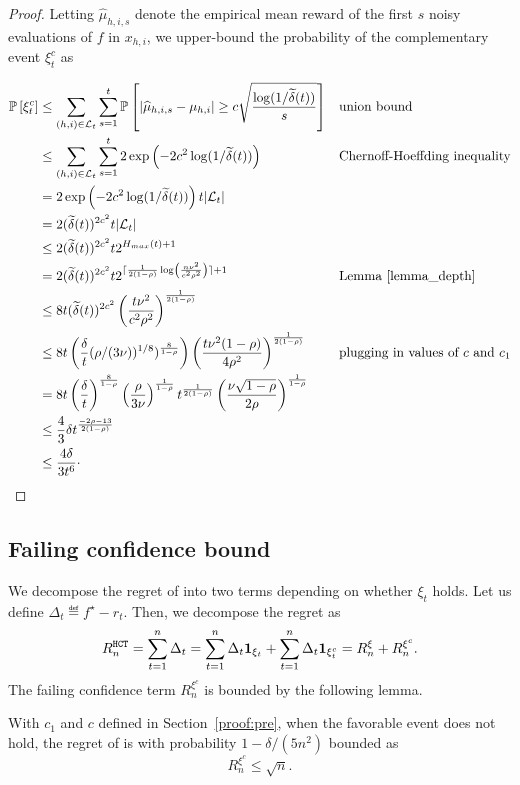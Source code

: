 \begin{proof}
Letting $\hat{\mu}_{h,i,s}$ denote the empirical mean reward of the first $s$ noisy evaluations of $f$ in $x_{h,i}$, we upper-bound the probability of the complementary event $\xi_t^c$ as

\begin{align*}
    \mathbb{P}\left[ \xi_t^c \right]
    & \leq \sum_{(h,i)\in\mathcal{L}_t}\sum_{s=1}^{t} \mathbb{P}\left[ |\widehat{\mu}_{h,i,s} - \mu_{h,i}| \geq c\sqrt{\frac{\operatorname{log}(1/\widetilde{\delta}(t))}{s}} \right] && \text{union bound} \\
    & \leq \sum_{(h,i)\in\mathcal{L}_t}\sum_{s=1}^{t} 2\operatorname{exp}\left( -2c^2\operatorname{log}(1/\widetilde{\delta}(t)) \right) && \text{Chernoff-Hoeffding inequality} \\
    & = 2\operatorname{exp}\left( -2c^2\operatorname{log}(1/\widetilde{\delta}(t)) \right) t|\mathcal{L}_t| \\
    & = 2(\widetilde{\delta}(t))^{2c^2}t|\mathcal{L}_t| \\
    & \leq 2(\widetilde{\delta}(t))^{2c^2}t 2^{H_{max}(t)+1} \\
    & = 2(\widetilde{\delta}(t))^{2c^2}t 2^{\lceil\frac{1}{2(1-\rho)}\operatorname{log}\left(\frac{n\nu^2}{c^2\rho^2} \right)\rceil+1} && \text{Lemma~\ref{lemma_depth}} \\
    & \leq 8t(\widetilde{\delta}(t))^{2c^2} \left( \frac{t\nu^2}{c^2\rho^2} \right)^{\frac{1}{2(1-\rho)}} \\
    & \leq 8t\left(\frac{\delta}{t} (\rho/(3\nu))^{1/8})^{\frac{8}{1-\rho}}\right) \left( \frac{t\nu^2(1-\rho)}{4\rho^2}\right)^{\frac{1}{2(1-\rho)}} && \text{plugging in values of $c$ and $c_1$} \\
    & = 8t\left(\frac{\delta}{t}\right)^{\frac{8}{1-\rho}} \left(\frac{\rho}{3\nu}\right)^{\frac{1}{1-\rho}} t^{\frac{1}{2(1-\rho)}} \left( \frac{\nu\sqrt{1-\rho}}{2\rho}\right)^{\frac{1}{1-\rho}} \\
    & \leq \frac{4}{3} \delta t^{\frac{-2\rho-13}{2(1-\rho)}} \\
    & \leq \frac{4\delta}{3t^6}\cdot
\end{align*}

\end{proof}

\subsection{Failing confidence bound}\label{proof:lemma_failing}

We decompose the regret of \HCT into two terms depending on whether $\xi_t$ holds. Let us define $\Delta_t \eqdef f^\star - r_t$. Then, we decompose the regret as
\[
R_n^{\texttt{HCT}} = \sum_{t=1}^n \Delta_t = \sum_{t=1}^n \Delta_t {\bf 1}_{\xi_t} + \sum_{t=1}^n \Delta_t {\bf 1}_{\xi_t^c} = R_n^{\xi} + R_n^{\xi^c}.
\]
The failing confidence term $R_n^{\xi^c}$ is bounded by the following lemma.
\begin{lemma} \label{lemma_failing}
With $c_1$ and $c$ defined in Section~\ref{proof:pre}, when the favorable event does not hold, the regret of {\HCT} is with probability $1-\delta/(5n^2)$ bounded as
\[
R_n^{\xi^c} \leq \sqrt{n}.
\]
\end{lemma}

